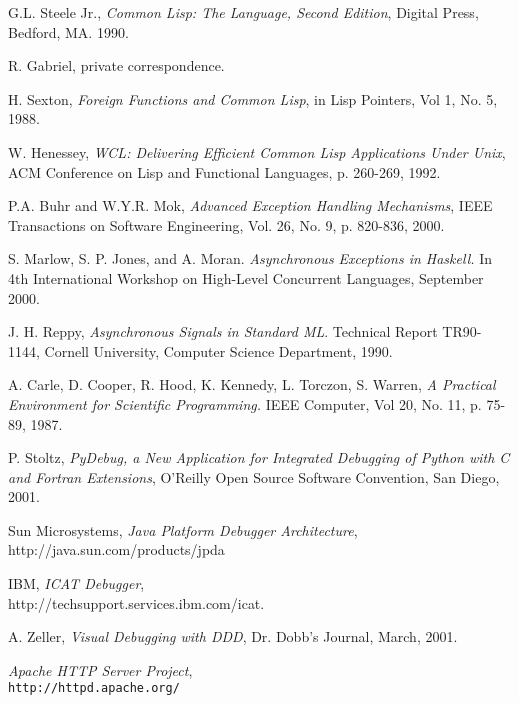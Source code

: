 \begin{thebibliography}{99}
 G.L. Steele Jr., {\em Common Lisp: The Language, Second Edition}, Digital Press,
Bedford, MA. 1990.

 R. Gabriel, private correspondence.

 H. Sexton, {\em Foreign Functions and Common Lisp}, in Lisp Pointers, Vol 1, No. 5, 1988.

 W. Henessey, {\em WCL: Delivering Efficient Common Lisp Applications Under Unix},
ACM Conference on Lisp and Functional Languages, p. 260-269, 1992.

 P.A. Buhr and W.Y.R. Mok, {\em Advanced Exception Handling Mechanisms}, IEEE Transactions on Software Engineering,
Vol. 26, No. 9, p. 820-836, 2000. 

 S. Marlow, S. P. Jones, and A. Moran. {\em
Asynchronous Exceptions in Haskell.} In 4th International Workshop on
High-Level Concurrent Languages, September 2000.

 J. H. Reppy, {\em Asynchronous Signals in Standard ML}. Technical Report TR90-1144,
Cornell University, Computer Science Department, 1990.

 A. Carle, D. Cooper, R. Hood, K. Kennedy, L. Torczon, S. Warren, 
{\em A Practical Environment for Scientific Programming.}
IEEE Computer, Vol 20, No. 11, p. 75-89, 1987.

 P. Stoltz, {\em PyDebug, a New Application for Integrated
Debugging of Python with C and Fortran Extensions}, O'Reilly Open Source Software Convention,
San Diego, 2001.

 Sun Microsystems, {\em Java Platform Debugger Architecture}, 
http://java.sun.com/products/jpda

 IBM, {\em ICAT Debugger}, \\
http://techsupport.services.ibm.com/icat.

 A. Zeller, {\em Visual Debugging with DDD}, Dr. Dobb's Journal, March, 2001.

 {\em Apache HTTP Server Project}, \\
{\tt http://httpd.apache.org/}

\end{thebibliography}










